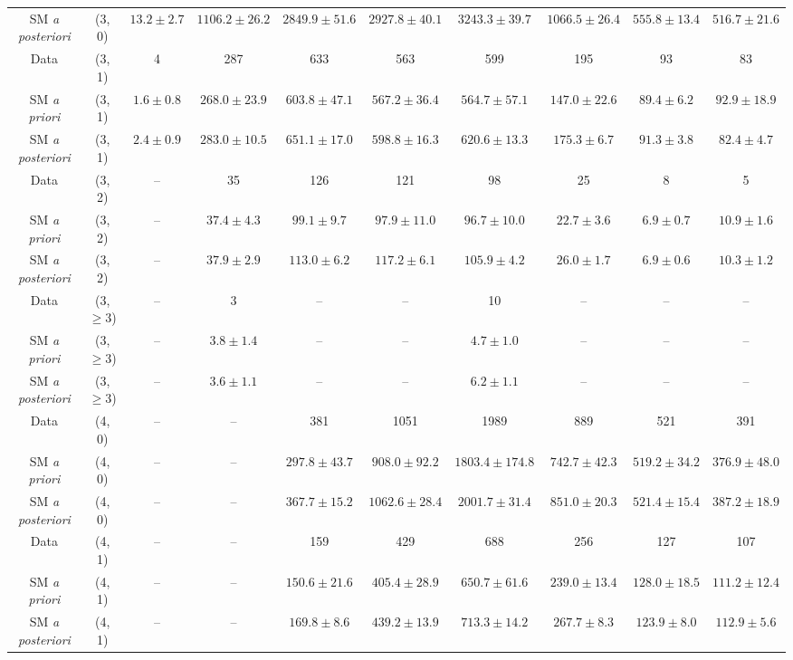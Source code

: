 \begin{table}[h!]
{\begin{tabular}{cccccccccc}
	SM \textit{a posteriori} & (3, 0) & $13.2\pm 2.7$ & $1106.2\pm 26.2$ & $2849.9\pm 51.6$ & $2927.8\pm 40.1$ & $3243.3\pm 39.7$ & $1066.5\pm 26.4$ & $555.8\pm 13.4$ & $516.7\pm 21.6$ \\[0.5ex] 
	Data & (3, 1) & 4 & 287 & 633 & 563 & 599 & 195 & 93 & 83 \\[0.5ex] 
	SM \textit{a priori} & (3, 1) & $1.6\pm 0.8$ & $268.0\pm 23.9$ & $603.8\pm 47.1$ & $567.2\pm 36.4$ & $564.7\pm 57.1$ & $147.0\pm 22.6$ & $89.4\pm 6.2$ & $92.9\pm 18.9$ \\[0.5ex] 
	SM \textit{a posteriori} & (3, 1) & $2.4\pm 0.9$ & $283.0\pm 10.5$ & $651.1\pm 17.0$ & $598.8\pm 16.3$ & $620.6\pm 13.3$ & $175.3\pm 6.7$ & $91.3\pm 3.8$ & $82.4\pm 4.7$ \\[0.5ex] 
	Data & (3, 2) & -- & 35 & 126 & 121 & 98 & 25 & 8 & 5 \\[0.5ex] 
	SM \textit{a priori} & (3, 2) & -- & $37.4\pm 4.3$ & $99.1\pm 9.7$ & $97.9\pm 11.0$ & $96.7\pm 10.0$ & $22.7\pm 3.6$ & $6.9\pm 0.7$ & $10.9\pm 1.6$ \\[0.5ex] 
	SM \textit{a posteriori} & (3, 2) & -- & $37.9\pm 2.9$ & $113.0\pm 6.2$ & $117.2\pm 6.1$ & $105.9\pm 4.2$ & $26.0\pm 1.7$ & $6.9\pm 0.6$ & $10.3\pm 1.2$ \\[0.5ex] 
	Data & (3, $\ge3$) & -- & 3 & -- & -- & 10 & -- & -- & -- \\[0.5ex] 
	SM \textit{a priori} & (3, $\ge3$) & -- & $3.8\pm 1.4$ & -- & -- & $4.7\pm 1.0$ & -- & -- & -- \\[0.5ex] 
	SM \textit{a posteriori} & (3, $\ge3$) & -- & $3.6\pm 1.1$ & -- & -- & $6.2\pm 1.1$ & -- & -- & -- \\[0.5ex] 
	Data & (4, 0) & -- & -- & 381 & 1051 & 1989 & 889 & 521 & 391 \\[0.5ex] 
	SM \textit{a priori} & (4, 0) & -- & -- & $297.8\pm 43.7$ & $908.0\pm 92.2$ & $1803.4\pm 174.8$ & $742.7\pm 42.3$ & $519.2\pm 34.2$ & $376.9\pm 48.0$ \\[0.5ex] 
	SM \textit{a posteriori} & (4, 0) & -- & -- & $367.7\pm 15.2$ & $1062.6\pm 28.4$ & $2001.7\pm 31.4$ & $851.0\pm 20.3$ & $521.4\pm 15.4$ & $387.2\pm 18.9$ \\[0.5ex] 
	Data & (4, 1) & -- & -- & 159 & 429 & 688 & 256 & 127 & 107 \\[0.5ex] 
	SM \textit{a priori} & (4, 1) & -- & -- & $150.6\pm 21.6$ & $405.4\pm 28.9$ & $650.7\pm 61.6$ & $239.0\pm 13.4$ & $128.0\pm 18.5$ & $111.2\pm 12.4$ \\[0.5ex] 
	SM \textit{a posteriori} & (4, 1) & -- & -- & $169.8\pm 8.6$ & $439.2\pm 13.9$ & $713.3\pm 14.2$ & $267.7\pm 8.3$ & $123.9\pm 8.0$ & $112.9\pm 5.6$ \\[0.5ex] 

\end{tabular}}
\end{table}
